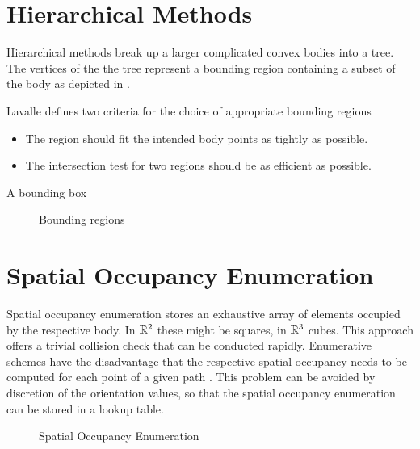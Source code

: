 \section{Hierarchical Methods}
Hierarchical methods break up a larger complicated convex bodies into a tree. The vertices of the the tree represent a bounding region containing a subset of the body as depicted in .

Lavalle defines two criteria for the choice of appropriate bounding regions

\begin{itemize}
	\item The region should fit the intended body points as tightly as possible.
	\item The intersection test for two regions should be as efficient as possible.
\end{itemize}

A bounding box \cite{Ericson.2005} 

\begin{figure}[h]
    \caption{Bounding regions}
    \label{fig:boundingRegions}
\end{figure}

\section{Spatial Occupancy Enumeration}
Spatial occupancy enumeration stores an exhaustive array of elements occupied by the respective body. In $\mathbb{R}^2$ these might be squares, in $\mathbb{R}^3$ cubes. This approach offers a trivial collision check that can be conducted rapidly. Enumerative schemes have the disadvantage that the respective spatial occupancy needs to be computed for each point of a given path \cite{Hayward.1986}. This problem can be avoided by discretion of the orientation values, so that the spatial occupancy enumeration can be stored in a lookup table.

\begin{figure}[h]
    \caption{Spatial Occupancy Enumeration}
    \label{fig:spatialOccupancyEnumeration}
\end{figure}